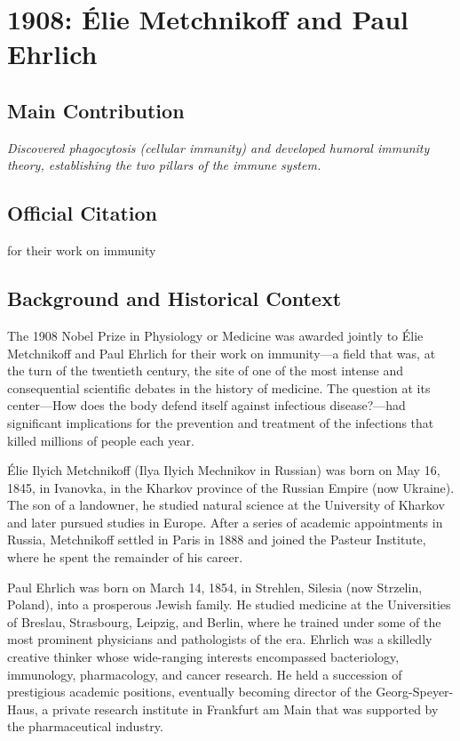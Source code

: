 \chapter[1908 --- E]{1908: \'{E}lie Metchnikoff and Paul Ehrlich}
\label{ch:1908_Metchnikoff}

\section*{Main Contribution}

\textit{Discovered phagocytosis (cellular immunity) and developed humoral immunity theory, establishing the two pillars of the immune system.}\cite{nobel-1908,lecture-1908}

\section{Official Citation}

for their work on immunity

\section{Background and Historical Context}

The 1908 Nobel Prize in Physiology or Medicine was awarded jointly to \'{E}lie Metchnikoff and Paul Ehrlich for their work on immunity---a field that was, at the turn of the twentieth century, the site of one of the most intense and consequential scientific debates in the history of medicine. The question at its center---How does the body defend itself against infectious disease?---had significant implications for the prevention and treatment of the infections that killed millions of people each year.

\'{E}lie Ilyich Metchnikoff (Ilya Ilyich Mechnikov in Russian) was born on May 16, 1845, in Ivanovka, in the Kharkov province of the Russian Empire (now Ukraine). The son of a landowner, he studied natural science at the University of Kharkov and later pursued studies in Europe. After a series of academic appointments in Russia, Metchnikoff settled in Paris in 1888 and joined the Pasteur Institute, where he spent the remainder of his career.

Paul Ehrlich was born on March 14, 1854, in Strehlen, Silesia (now Strzelin, Poland), into a prosperous Jewish family. He studied medicine at the Universities of Breslau, Strasbourg, Leipzig, and Berlin, where he trained under some of the most prominent physicians and pathologists of the era. Ehrlich was a skilledly creative thinker whose wide-ranging interests encompassed bacteriology, immunology, pharmacology, and cancer research. He held a succession of prestigious academic positions, eventually becoming director of the Georg-Speyer-Haus, a private research institute in Frankfurt am Main that was supported by the pharmaceutical industry.

